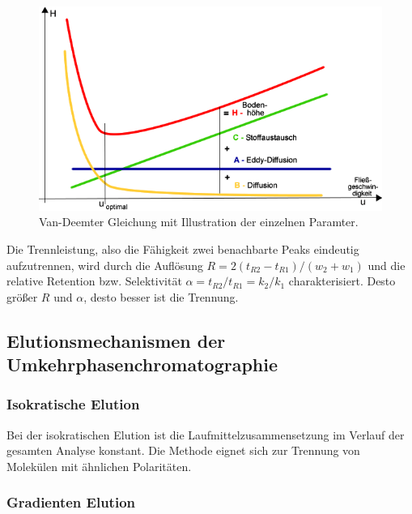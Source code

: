       \begin{figure}[H]
        \includegraphics[scale=0.4, center]{images/VanDeemterGleichung.png} 
        \caption[Van-Deemter Gleichung, Quelle:  (Zugegriffen am 07.01.2020)]{Van-Deemter Gleichung mit Illustration der einzelnen Paramter.}
        \label{fig:VanDeemterGleichung}
      \end{figure}    
    
    Die Trennleistung, also die Fähigkeit zwei benachbarte Peaks eindeutig aufzutrennen, wird durch die Auflösung $R = 2\left(t_{R2} - t_{R1}\right) / \left(w_2 + w_1\right)$ und die relative Retention bzw. Selektivität $\alpha = t_{R2} / t_{R1} = k_2 / k_1$ charakterisiert. Desto größer $R$ und $\alpha$, desto  besser ist die Trennung. \citep{Versuchsvorschrift}
    
  \subsection{Elutionsmechanismen der Umkehrphasenchromatographie}
  
    \subsubsection{Isokratische Elution}
    
      Bei der isokratischen Elution ist die Laufmittelzusammensetzung im Verlauf der gesamten Analyse konstant. Die Methode eignet sich zur Trennung von Molekülen mit ähnlichen Polaritäten.  \citep{SkriptHPLC}
      
    \subsubsection{Gradienten Elution}
      

